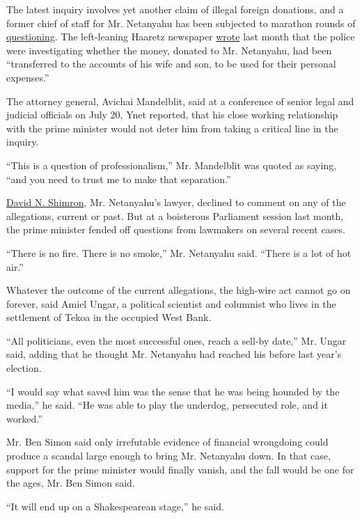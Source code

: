 The latest inquiry involves yet another claim of illegal foreign
donations, and a former chief of staff for Mr. Netanyahu has been
subjected to marathon rounds of
\href{http://www.jpost.com/Israel-News/Politics-And-Diplomacy/Netanyahu-Mandelblit-pour-cold-water-on-probe-prime-ministers-fund-raiser-460776}{questioning}.
The left-leaning Haaretz newspaper
\href{http://www.haaretz.com/israel-news/.premium-1.731830}{wrote} last
month that the police were investigating whether the money, donated to
Mr. Netanyahu, had been ``transferred to the accounts of his wife and
son, to be used for their personal expenses.''

The attorney general, Avichai Mandelblit, said at a conference of senior
legal and judicial officials on July 20, Ynet reported, that his close
working relationship with the prime minister would not deter him from
taking a critical line in the inquiry.

``This is a question of professionalism,'' Mr. Mandelblit was quoted as
saying, ``and you need to trust me to make that separation.''

\href{http://www.smplaw.co.il/list.asp?categoryId=127\&id=686}{David N.
Shimron}, Mr. Netanyahu's lawyer, declined to comment on any of the
allegations, current or past. But at a boisterous Parliament session
last month, the prime minister fended off questions from lawmakers on
several recent cases.

``There is no fire. There is no smoke,'' Mr. Netanyahu said. ``There is
a lot of hot air.''

Whatever the outcome of the current allegations, the high-wire act
cannot go on forever, said Amiel Ungar, a political scientist and
columnist who lives in the settlement of Tekoa in the occupied West
Bank.

``All politicians, even the most successful ones, reach a sell-by
date,'' Mr. Ungar said, adding that he thought Mr. Netanyahu had reached
his before last year's election.

``I would say what saved him was the sense that he was being hounded by
the media,'' he said. ``He was able to play the underdog, persecuted
role, and it worked.''

Mr. Ben Simon said only irrefutable evidence of financial wrongdoing
could produce a scandal large enough to bring Mr. Netanyahu down. In
that case, support for the prime minister would finally vanish, and the
fall would be one for the ages, Mr. Ben Simon said.

``It will end up on a Shakespearean stage,'' he said.

